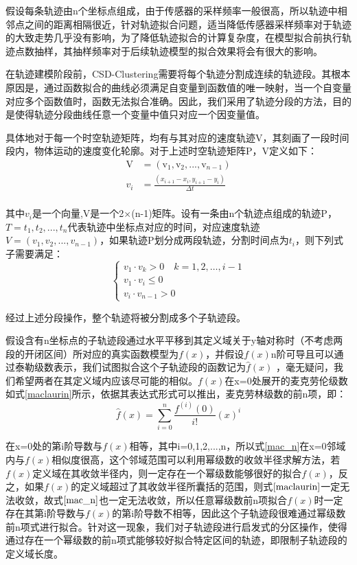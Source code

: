 假设每条轨迹由n个坐标点组成，由于传感器的采样频率一般很高，所以轨迹中相邻点之间的距离相隔很近，针对轨迹拟合问题，适当降低传感器采样频率对于轨迹的大致走势几乎没有影响，为了降低轨迹拟合的计算复杂度，在模型拟合前执行轨迹点数抽样，其抽样频率对于后续轨迹模型的拟合效果将会有很大的影响。

在轨迹建模阶段前，CSD-Clustering需要将每个轨迹分割成连续的轨迹段。其根本原因是，通过函数拟合的曲线必须满足自变量到函数值的唯一映射，当一个自变量对应多个函数值时，函数无法拟合准确。因此，我们采用了轨迹分段的方法，目的是使得轨迹分段曲线任意一个变量中值只对应一个因变量值。

具体地对于每一个时空轨迹矩阵，均有与其对应的速度轨迹V，其刻画了一段时间段内，物体运动的速度变化轮廓。对于上述时空轨迹矩阵P，V定义如下：
\[
\begin{aligned}
	\text{V}&=\left( \text{v}_1,\text{v}_2,...,\text{v}_{n-1} \right)\\
	v_i&=\frac{\left( x_{i+1}-x_i,y_{i+1}-y_i \right)}{\varDelta t}\\
\end{aligned}
\]

其中$v_i$是一个向量,V是一个2×(n-1)矩阵。设有一条由n个轨迹点组成的轨迹P，$T={t_1,t_2,...,t_n}$代表轨迹中坐标点对应的时间，对应速度轨迹$V=(v_1,v_2,...,v_{n-1})$，如果轨迹P划分成两段轨迹，分割时间点为$t_i$，则下列式子需要满足：
\[
\left\{\begin{array}{c}
{v_{1} \cdot v_{k}>0 \quad k=1,2, \ldots, i-1} \\
{v_{1} \cdot v_{i} \leq 0} \\
{v_{i} \cdot v_{n-1}>0}
\end{array}\right.
\]

经过上述分段操作，整个轨迹将被分割成多个子轨迹段。

假设含有n坐标点的子轨迹段通过水平平移到其定义域关于y轴对称时（不考虑两段的开闭区间）所对应的真实函数模型为$f(x)$，并假设$f(x)$n阶可导且可以通过泰勒级数表示，我们试图拟合这个子轨迹段的函数记为$\hat{f}\left( x \right)$ ，毫无疑问，我们希望两者在其定义域内应该尽可能的相似。$f(x)$在x=0处展开的麦克劳伦级数如式\ref{maclaurin}所示，依据其表达式形式可以推出，麦克劳林级数的前n项，即：
\begin{equation}
\label{mac_n}
\hat{f}\left( x \right) =\sum_{i=0}^n{\frac{f^{\left( i \right)}\left( 0 \right)}{i!}}\left( x \right) ^i
\end{equation}

在x=0处的第i阶导数与$f(x)$相等，其中i=0,1,2,...,n，所以式\ref{mac_n}在x=0邻域内与$f(x)$相似度很高，这个邻域范围可以利用幂级数的收敛半径求解方法，若$f(x)$定义域在其收敛半径内，则一定存在一个幂级数能够很好的拟合$f(x)$，反之，如果$f(x)$的定义域超过了其收敛半径所囊括的范围，则式$\ref{maclaurin}$一定无法收敛，故式$\ref{mac_n}$也一定无法收敛，所以任意幂级数前n项拟合$f(x)$时一定存在其第i阶导数与$f(x)$的第i阶导数不相等，因此这个子轨迹段很难通过幂级数前n项式进行拟合。针对这一现象，我们对子轨迹段进行启发式的分区操作，使得通过存在一个幂级数的前n项式能够较好拟合特定区间的轨迹，即限制子轨迹段的定义域长度。

